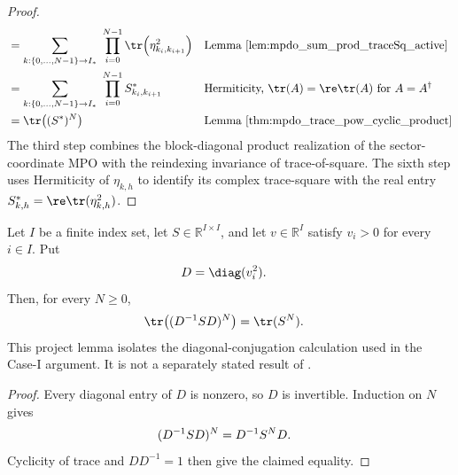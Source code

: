 \begin{proof}
\begin{align}
         & =\sum_{k:\{0,\ldots,N-1\}\to I_*}\ \prod_{i=0}^{N-1}
        \tr\!\left(\eta_{k_i,k_{i+1}}^2\right)
         &                                                                       & \text{Lemma~\ref{lem:mpdo_sum_prod_traceSq_active}}
        \notag                                                                                                                                    \\
         & =\sum_{k:\{0,\ldots,N-1\}\to I_*}\ \prod_{i=0}^{N-1}S^*_{k_i,k_{i+1}}
         &                                                                       & \text{Hermiticity, }\tr(A)=\re\tr(A)\text{ for }A=A^\dagger
        \notag                                                                                                                                    \\
         & =\tr\!\left((S^*)^N\right)
         &                                                                       & \text{Lemma~\ref{thm:mpdo_trace_pow_cyclic_product}}
        \notag
    \end{align}
    The third step combines the block-diagonal product realization of
    the sector-coordinate MPO with the reindexing invariance of
    trace-of-square. The sixth step uses Hermiticity of $\eta_{k,h}$ to
    identify its complex trace-square with the real entry
    $S^*_{k,h}=\re\tr(\eta_{k,h}^2)$.
\end{proof}

\begin{lemma}
    \label{thm:mpdo_trace_pow_similarity_squared_diagonal}
    \leanok
    Let $I$ be a finite index set, let $S\in\mathbb R^{I\times I}$, and
    let $v\in\mathbb R^I$ satisfy $v_i>0$ for every $i\in I$. Put
    \begin{align}
        D & =\diag(v_i^2).
        \notag
    \end{align}
    Then, for every $N\geq0$,
    \begin{align}
        \tr\!\left((D^{-1}SD)^N\right)
         & =\tr(S^N).
        \notag
    \end{align}
    This project lemma isolates the diagonal-conjugation calculation used in
    the Case-I argument. It is not a separately stated result of
    \cite{Cirac2016MPDO_arXiv}.
\end{lemma}

\begin{proof}
    \leanok
    Every diagonal entry of $D$ is nonzero, so $D$ is invertible. Induction
    on $N$ gives
    \begin{align}
        (D^{-1}SD)^N & =D^{-1}S^ND.
        \notag
    \end{align}
    Cyclicity of trace and $DD^{-1}=1$ then give the claimed equality.
\end{proof}

